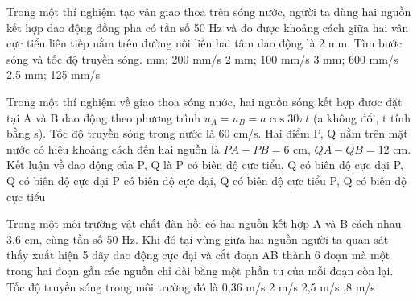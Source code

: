 \begin{vidu}%
Trong một thí nghiệm tạo vân giao thoa trên sóng nước, người ta dùng hai nguồn kết hợp dao động đồng pha có tần số 50 Hz và đo được khoảng cách giữa hai vân cực tiểu liên tiếp nằm trên đường nối liền hai tâm dao động là 2 mm. Tìm bước sóng và tốc độ truyền sóng.
\choice
{ mm; 200 mm/s}
{2 mm; 100 mm/s}
{3 mm; 600 mm/s}
{2,5 mm; 125 mm/s}
\end{vidu} 
\begin{vidu}%
Trong một thí nghiệm về giao thoa sóng nước, hai nguồn sóng kết hợp được đặt tại A và B dao động theo phương trình $u_A = u_B = a\cos30\pi t$ (a không đổi, t tính bằng s). Tốc độ truyền sóng trong nước là 60 cm/s. Hai điểm P, Q nằm trên mặt nước có hiệu khoảng cách đến hai nguồn là $PA-PB=6$ cm, $QA-QB=12$ cm. Kết luận về dao động của P, Q là
\choice
{\True P có biên độ cực tiểu, Q có biên độ cực đại}
{P, Q có biên độ cực đại}
{P có biên độ cực đại, Q có biên độ cực tiểu}
{P, Q có biên độ cực tiểu}
\end{vidu} 
\begin{vidu}%
Trong một môi trường vật chất đàn hồi có hai nguồn kết hợp A và B cách nhau 3,6 cm, cùng tần số 50 Hz. Khi đó tại vùng giữa hai nguồn người ta quan sát thấy xuất hiện 5 dãy dao động cực đại và cắt đoạn AB thành 6 đoạn mà một trong hai đoạn gần các nguồn chỉ dài bằng một phần tư của mỗi đoạn còn lại. Tốc độ truyền sóng trong môi trường đó là
\choice
{0,36 m/s}
{2 m/s}
{2,5 m/s}
{,8 m/s}
\end{vidu} 
